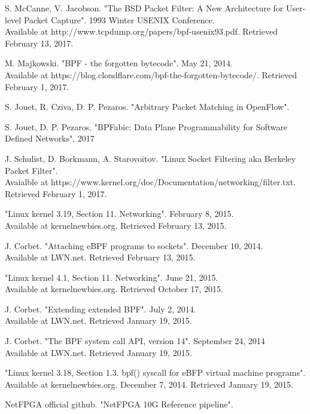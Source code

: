 \documentclass{l4proj}
\begin{document}


\begin{enumerate}[label={[\arabic*]}]
\item S. McCanne, V. Jacobson. "The BSD Packet Filter: A New Architecture for User-level Packet Capture". 1993 Winter USENIX Conference.\\
Available at http://www.tcpdump.org/papers/bpf-usenix93.pdf. Retrieved February 13, 2017.
\item M. Majkowski. "BPF - the forgotten bytecode". May 21, 2014.\\
Available at https://blog.cloudflare.com/bpf-the-forgotten-bytecode/. Retrieved February 1, 2017.
\item S. Jouet, R. Cziva, D. P. Pezaros. "Arbitrary Packet Matching in OpenFlow". 
\item S. Jouet, D. P. Pezaros. "BPFabic: Data Plane Programmability for Software Defined Networks", 2017
\item J. Schulist, D. Borkmann, A. Starovoitov. "Linux Socket Filtering aka Berkeley Packet Filter".\\
Avaialble at https://www.kernel.org/doc/Documentation/networking/filter.txt. Retrieved February 1, 2017.
\item "Linux kernel 3.19, Section 11. Networking". February 8, 2015.\\
Available at kernelnewbies.org. Retrieved February 13, 2015.
\item J. Corbet. "Attaching eBPF programs to sockets". December 10, 2014.\\
Available at LWN.net. Retrieved February 13, 2015.
\item "Linux kernel 4.1, Section 11. Networking". June 21, 2015.\\
Available at kernelnewbies.org. Retrieved October 17, 2015.
\item J. Corbet. "Extending extended BPF". July 2, 2014.\\
Available at LWN.net. Retrieved January 19, 2015.
\item J. Corbet. "The BPF system call API, version 14". September 24, 2014\\
Available at LWN.net. Retrieved January 19, 2015.
\item "Linux kernel 3.18, Section 1.3. bpf() syscall for eBFP virtual machine programs".\\
Available at kernelnewbies.org. December 7, 2014. Retrieved January 19, 2015.
\item NetFPGA official github. "NetFPGA 10G Reference pipeline".\\

\end{enumerate}
\end{document}
